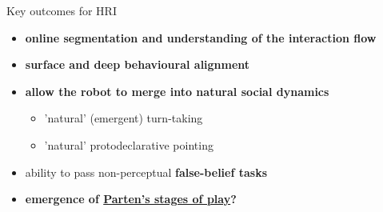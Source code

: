 \documentclass[compress]{beamer}
\begin{document}
\begin{frame}{Key outcomes for HRI}

    \begin{itemize}

        \item {\bf online segmentation and understanding of the interaction
            flow}

        \item {\bf surface and deep behavioural alignment}


        \item {\bf allow the robot to merge into natural social dynamics}
            \begin{itemize}
                \item 'natural' (\ie emergent) turn-taking
                \item 'natural' protodeclarative pointing
            \end{itemize}

    \end{itemize}

    \pause
    \begin{itemize}
        \item ability to pass non-perceptual {\bf false-belief tasks}

        \item {\bf emergence of \hyperlink{parten}{Parten's stages of
            play}?}


    \end{itemize}

\end{frame}



\end{document}
